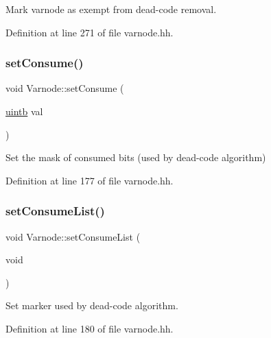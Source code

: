 Mark varnode as exempt from dead-\/code removal. 



Definition at line 271 of file varnode.\+hh.

\mbox{\label{class_varnode_a809aa02a00ff30f8348009bb31c2499a}} 
\subsubsection{\texorpdfstring{setConsume()}{setConsume()}}
{\footnotesize\ttfamily void Varnode\+::set\+Consume (\begin{DoxyParamCaption}\item[{\mbox{\hyperlink{types_8h_a2db313c5d32a12b01d26ac9b3bca178f}{uintb}}}]{val }\end{DoxyParamCaption})\hspace{0.3cm}{\ttfamily [inline]}}



Set the mask of consumed bits (used by dead-\/code algorithm) 



Definition at line 177 of file varnode.\+hh.

\mbox{\label{class_varnode_a5efe867c5c6e0569fc73e42bd3dbfaaf}} 
\subsubsection{\texorpdfstring{setConsumeList()}{setConsumeList()}}
{\footnotesize\ttfamily void Varnode\+::set\+Consume\+List (\begin{DoxyParamCaption}\item[{void}]{ }\end{DoxyParamCaption})\hspace{0.3cm}{\ttfamily [inline]}}



Set marker used by dead-\/code algorithm. 



Definition at line 180 of file varnode.\+hh.

\mbox{\label{class_varnode_ae4566fd118bbbbc625b10861e35ee312}} 
